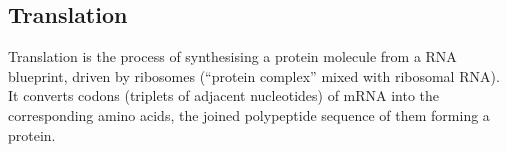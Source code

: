 

\subsection{Translation}
Translation is the process of synthesising a protein molecule from a RNA blueprint, driven by ribosomes (\enquote{protein complex} mixed with ribosomal RNA). It converts codons (triplets of adjacent nucleotides) of mRNA into the corresponding amino acids, the joined polypeptide sequence of them forming a protein.  

